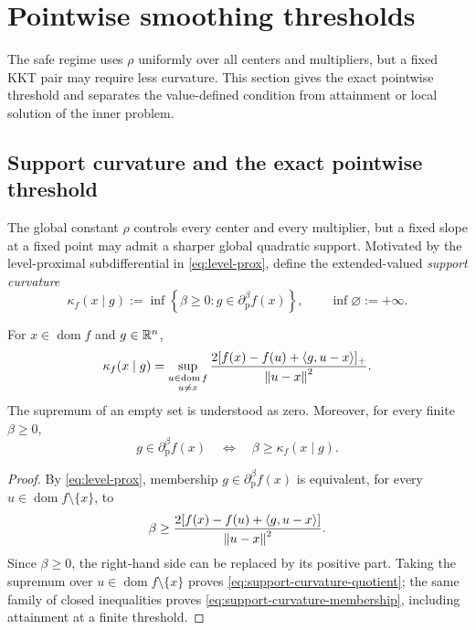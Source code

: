 \section{Pointwise smoothing thresholds}
\label{sec:thresholds}

The safe regime uses \(\rho\) uniformly over all centers and multipliers, but
a fixed KKT pair may require less curvature.  This section gives the exact
pointwise threshold and separates the value-defined condition from attainment
or local solution of the inner problem.

\subsection{Support curvature and the exact pointwise threshold}

The global constant \(\rho\) controls every center and every multiplier, but a
fixed slope at a fixed point may admit a sharper global quadratic support.
Motivated by the level-proximal subdifferential in
\cref{eq:level-prox}, define the extended-valued
\emph{support curvature}
\begin{equation}
  \kappa_f(x\mid g)
  :=
  \inf\left\{
    \beta\ge0:
    g\in\partial_{\mathrm p}^{\beta}f(x)
  \right\},
  \qquad \inf\varnothing:=+\infty.
  \label{eq:support-curvature}
\end{equation}

\begin{lemma}
  \label{lem:support-curvature}
  For \(x\in\operatorname{dom}f\) and \(g\in\mathbb{R}^n\),
  \begin{equation}
    \kappa_f(x\mid g)
    =
    \sup_{\substack{u\in\operatorname{dom}f\\u\ne x}}
    \frac{
      2[f(x)-f(u)+\left\langle g,u-x\right\rangle]_+
    }{\left\lVert u-x\right\rVert^2}.
    \label{eq:support-curvature-quotient}
  \end{equation}
  The supremum of an empty set is understood as zero.  Moreover, for every
  finite \(\beta\ge0\),
  \begin{equation}
    g\in\partial_{\mathrm p}^{\beta}f(x)
    \quad\Longleftrightarrow\quad
    \beta\ge\kappa_f(x\mid g).
    \label{eq:support-curvature-membership}
  \end{equation}
\end{lemma}

\begin{proof}
  By \cref{eq:level-prox}, membership
  \(g\in\partial_{\mathrm p}^{\beta}f(x)\) is equivalent, for every
  \(u\in\operatorname{dom}f\setminus\{x\}\), to
  \[
    \beta
    \ge
    \frac{2[f(x)-f(u)+\left\langle g,u-x\right\rangle]}{\left\lVert u-x\right\rVert^2}.
  \]
  Since \(\beta\ge0\), the right-hand side can be replaced by its positive
  part.  Taking the supremum over
  \(u\in\operatorname{dom}f\setminus\{x\}\) proves
  \cref{eq:support-curvature-quotient}; the same family of closed
  inequalities proves \cref{eq:support-curvature-membership}, including
  attainment at a finite threshold.
\end{proof}

